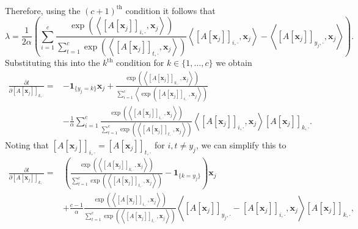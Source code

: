 \begin{tproof}
\begin{align*}
    \end{align*}
    Therefore, using the $(c+1)^{\text{th}}$ condition it follows that $$\lambda=\frac{1}{2\alpha}\left(\sum_{i=1}^c\frac{\exp\left(\left\langle\left[A\left[\mathbf{x}_j\right]\right]_{i,\cdot},\mathbf{x}_j\right\rangle\right)}{\sum_{t=1}^c\exp\left(\left\langle\left[A\left[\mathbf{x}_j\right]\right]_{t,\cdot},\mathbf{x}_j\right\rangle\right)}\left\langle\left[A\left[\mathbf{x}_j\right]\right]_{i,\cdot},\mathbf{x}_j\right\rangle-\left\langle\left[A\left[\mathbf{x}_j\right]\right]_{y_j,\cdot},\mathbf{x}_j\right\rangle\right).$$Substituting this into the $k^\text{th}$ condition for $k\in\{1,\dots,c\}$ we obtain 
    \begin{align*}
        \frac{\partial l}{\partial\left[A\left[\mathbf{x}_j\right]\right]_{k,\cdot}}=&-\mathbf{1}_{\{y_j=k\}}\mathbf{x}_j+\frac{\exp\left(\left\langle\left[A\left[\mathbf{x}_j\right]\right]_{k,\cdot},\mathbf{x}_j\right\rangle\right)}{\sum_{i=1}^c\left\langle\exp\left(\left[A\left[\mathbf{x}_j\right]\right]_{i,\cdot},\mathbf{x}_j\right\rangle\right)}\\&-\frac{1}{\alpha}\sum_{i=1}^c\frac{\exp\left(\left\langle\left[A\left[\mathbf{x}_j\right]\right]_{i,\cdot},\mathbf{x}_j\right\rangle\right)}{\sum_{t=1}^c\exp\left(\left\langle\left[A\left[\mathbf{x}_j\right]\right]_{t,\cdot},\mathbf{x}_j\right\rangle\right)}\left\langle\left[A\left[\mathbf{x}_j\right]\right]_{i,\cdot},\mathbf{x}_j\right\rangle\left[A\left[\mathbf{x}_j\right]\right]_{k,\cdot}.
    \end{align*}
    Noting that $\left[A\left[\mathbf{x}_j\right]\right]_{i,\cdot}=\left[A\left[\mathbf{x}_j\right]\right]_{t,\cdot}$ for $i,t\neq y_j$, we can simplify this to 
    \begin{align*}
        \frac{\partial l}{\partial\left[A\left[\mathbf{x}_j\right]\right]_{k,\cdot}}=&\left(\frac{\exp\left(\left\langle\left[A\left[\mathbf{x}_j\right]\right]_{k,\cdot},\mathbf{x}_j\right\rangle\right)}{\sum_{t=1}^c\exp\left(\left\langle\left[A\left[\mathbf{x}_j\right]\right]_{t,\cdot},\mathbf{x}_j\right\rangle\right)}-\mathbf{1}_{\{k=y_j\}}\right)\mathbf{x}_j\\&+\frac{c-1}{\alpha}\frac{\exp\left(\left\langle\left[A\left[\mathbf{x}_j\right]\right]_{i,\cdot},\mathbf{x}_j\right\rangle\right)}{\sum_{t=1}^c\exp\left(\left\langle\left[A\left[\mathbf{x}_j\right]\right]_{t,\cdot},\mathbf{x}_j\right\rangle\right)}\left\langle\left[A\left[\mathbf{x}_j\right]\right]_{y_j,\cdot}-\left[A\left[\mathbf{x}_j\right]\right]_{i,\cdot},\mathbf{x}_j\right\rangle\left[A\left[\mathbf{x}_j\right]\right]_{k,\cdot},

\end{align*}
\end{tproof}
